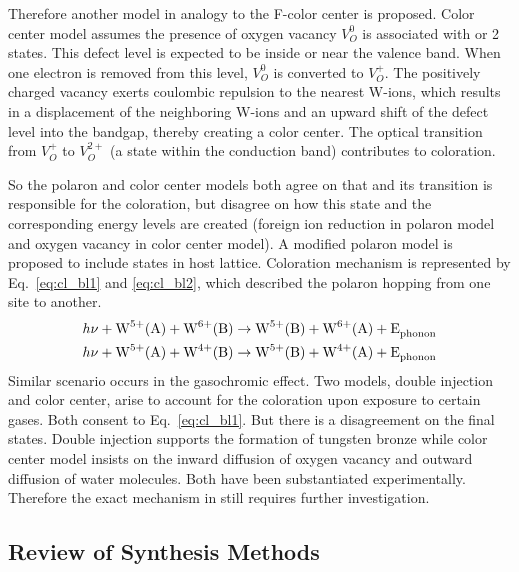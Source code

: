 Therefore another model in analogy to the F-color center is proposed. Color center model assumes the presence of oxygen vacancy $V_O^0$ is associated with  or 2 states. This defect level is expected to be inside or near the valence band. When one electron is removed from this level, $V_O^0$ is converted to $V_O^+$. The positively charged vacancy exerts coulombic repulsion to the nearest W-ions, which results in a displacement of the neighboring W-ions and an upward shift of the defect level into the bandgap, thereby creating a color center. The optical transition from $V_O^+$ to $V_O^{2+}$ (a state within the conduction band) contributes to coloration.\cite{Deb2008}

So the polaron and color center models both agree on that  and its transition is responsible for the coloration, but disagree on how this  state and the corresponding energy levels are created (foreign ion reduction in polaron model and oxygen vacancy in color center model). A modified polaron model is proposed to include  states in host lattice. Coloration mechanism is represented by Eq.~\ref{eq:cl_bl1} and \ref{eq:cl_bl2}, which described the polaron hopping from one site to another.\cite{Chatten2005}
\begin{align}
h\nu +\ce{W^{5+}(A)} +  \ce{W^{6+}(B)} &\rightarrow \ce{W^{5+}(B)} + \ce{W^{6+}(A) + E_{phonon}} \label{eq:cl_bl1}\\
h\nu +\ce{W^{5+}(A)} +  \ce{W^{4+}(B)} &\rightarrow \ce{W^{5+}(B)} + \ce{W^{4+}(A) + E_{phonon}} \label{eq:cl_bl2}
\end{align}
Similar scenario occurs in the gasochromic effect. Two models, double injection and color center, arise to account for the coloration upon exposure to certain gases. Both consent to Eq.~\ref{eq:cl_bl1}. But there is a disagreement on the final states. Double injection supports the formation of tungsten bronze  while color center model insists on the inward diffusion of oxygen vacancy and outward diffusion of water molecules. Both have been substantiated experimentally. Therefore the exact mechanism in  still requires further investigation.

\subsection{Review of Synthesis Methods}\label{sec:woxgrowth}

